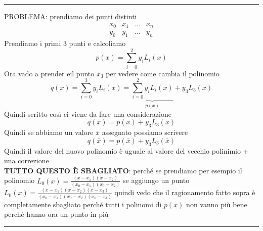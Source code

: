 \documentclass[a4paper, portrait]{book}
\numberwithin{equation}{chapter} %
\newcommand*\sepline{%
  \begin{center}
    \rule[1ex]{.5\textwidth}{.5pt}
  \end{center}}
\begin{document}
\sepline{}
PROBLEMA: prendiamo dei punti distinti
\begin{equation}
    \begin{matrix}
        x_0&x_1&...&x_n\\
        y_0&y_1&...&y_n
    \end{matrix}
\end{equation}
Prendiamo i primi 3 punti e calcoliamo
\begin{equation}
    p(x) = \sum_{i=0}^2 y_i L_i(x)
\end{equation}
Ora vado a prender eil punto $x_3$ per vedere come cambia il polinomio
\begin{equation}
    q(x) = \sum_{i=0}^{3} y_i L_i(x) = \underbrace{\sum_{i=0}^{2}y_i L_i(x)}_{p(x)} + y_3 L_3(x)
\end{equation}
Quindi scritto così ci viene da fare una considerazione
\begin{equation}
    q(x) = p(x) + y_3 L_3(x)
\end{equation}
Quindi se abbiamo un valore $\bar{x}$ assegnato possiamo scrivere
\begin{equation}
    q(\bar{x}) = p(\bar{x}) + y_3 L_3(\bar{x})
\end{equation}
Quindi il valore del nuovo polinomio è uguale al valore del vecchio polinimio + una correzione
\\\textbf{TUTTO QUESTO È SBAGLIATO}: perché se prendiamo per esempio il polinomio $L_0(x) = \frac{(x-x_1)(x-x_2)}{(x_0 - x_1)(x_0-x_2)}$ se aggiungo un punto $L_0(x) = \frac{(x-x_1)(x-x_2)(x-x_3)}{(x_0 - x_1)(x_0-x_2)(x_0-x_3)}$ quindi vedo che il ragionamento fatto sopra è completamente sbagliato perché tutti i polinomi di $p(x)$ non vanno più bene perché hanno ora un punto in più
\sepline{}
\end{document}
